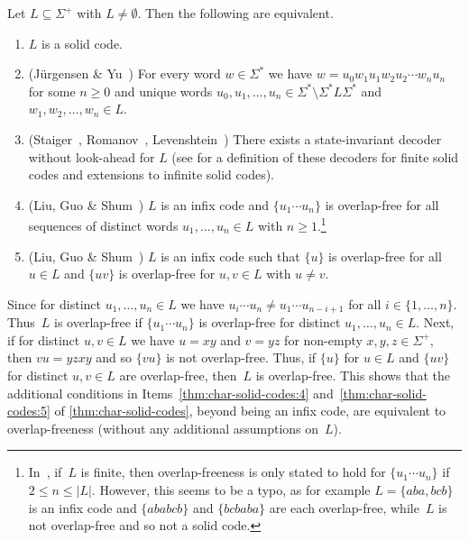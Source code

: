 \begin{theorem} \label{thm:char-solid-codes}
Let $L \subseteq \Sigma^+$ with $L \ne \emptyset$. Then the following are equivalent.
\begin{enumerate}
	
\item  \label{thm:char-solid-codes:1} $L$ is a solid code.
	
\item  \label{thm:char-solid-codes:2} (Jürgensen \& Yu~\cite{DBLP:journals/eik/JurgensenY90}) For every word $w \in \Sigma^*$ 
 we have $w = u_0 w_1 u_1 w_2 u_2 \cdots w_n u_n$
 for some $n \ge 0$ and unique words $u_0, u_1, \ldots, u_n \in \Sigma^* \setminus \Sigma^* L \Sigma^*$
 and $w_1, w_2, \ldots, w_n \in L$.
	
\item \label{thm:char-solid-codes:3} (Staiger~\cite{DBLP:journals/tcs/JurgensenS21}, Romanov~\cite{Rom66}, Levenshtein~\cite{Lev64})
 There exists a state-invariant decoder without look-ahead for $L$ (see \cite[Def.~9]{DBLP:journals/tcs/JurgensenS21}
 for a definition of these decoders for finite solid codes and extensions to infinite solid codes).

\item \label{thm:char-solid-codes:4} (Liu, Guo \& Shum~\cite[Thm.~2.4]{Liu2021}) $L$ is an infix code and $\{ u_1\cdots u_n \}$ is overlap-free for 
 all sequences of distinct words $u_1, \ldots, u_n \in L$ with $n \ge 1$.\footnote{In~\cite[Thm.~2.4]{Liu2021},
 	if~$L$ is finite, then overlap-freeness is only stated to hold for $\{u_1\cdots u_n\}$
 	if $2 \le n \le |L|$. However, this seems to be a typo,
 	as for example $L = \{ aba, bcb \}$
 	is an infix code
 	and $\{ ababcb\}$ and $\{ bcbaba \}$
 	are each overlap-free, while~$L$
 	is not overlap-free and so not a solid code.} 
 
\item \label{thm:char-solid-codes:5} (Liu, Guo \& Shum~\cite[Thm.~2.4]{Liu2021}) $L$ is an infix code such that $\{u\}$ is overlap-free for all $u \in L$ and $\{uv\}$ is overlap-free for $u,v \in L$ with $u \ne v$.
\end{enumerate}	
\end{theorem}

\begin{remark}
	Since for distinct $u_1, \ldots, u_n \in L$
	we have $u_i \cdots u_n \ne u_1 \cdots u_{n - i + 1}$
	for all $i \in \{1,\ldots,n\}$.
	Thus~$L$ is overlap-free
	if $\{ u_1 \cdots u_n \}$
	is overlap-free for distinct $u_1, \ldots, u_n \in L$.
	Next, if for distinct $u,v \in L$
	we have $u = xy$ and $v = yz$
	for non-empty $x,y,z \in \Sigma^+$,
	then $vu = yzxy$ and so $\{vu\}$
	is not overlap-free.
	Thus, if $\{u\}$ for $u \in L$ and $\{uv\}$
	for distinct $u,v \in L$ are overlap-free,
	then~$L$ is overlap-free.
	This shows that the additional conditions in Items~\ref{thm:char-solid-codes:4} and~\ref{thm:char-solid-codes:5} of \cref{thm:char-solid-codes}, beyond being an infix code, are equivalent to overlap-freeness (without any additional assumptions on~$L$).
\end{remark}

